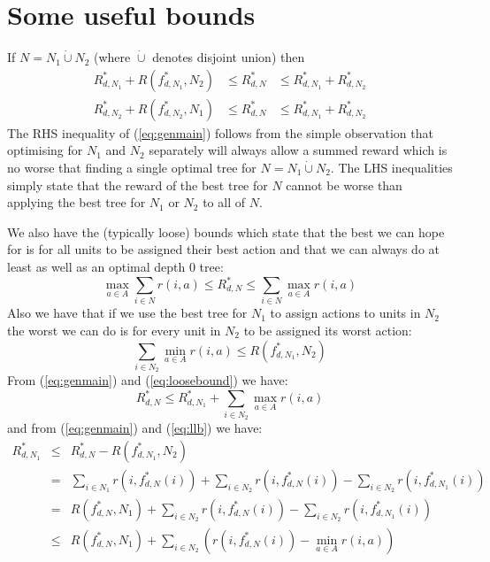 \documentclass{article}
\begin{document}
\section{Some useful bounds}
\label{sec:bounds}

If $N = N_{1} \dot\cup N_{2}$ (where $\dot\cup$ denotes disjoint
union) then
\begin{eqnarray}
  \label{eq:genmain}
 R^{*}_{d,N_{1}} + R(f^{*}_{d,N_{1}},N_{2})  & \leq R^{*}_{d,N}  & \leq  R^{*}_{d,N_{1}} + R^{*}_{d,N_{2}} \\
 R^{*}_{d,N_{2}} + R(f^{*}_{d,N_{2}},N_{1})  & \leq R^{*}_{d,N}  & \leq  R^{*}_{d,N_{1}} + R^{*}_{d,N_{2}} 
\end{eqnarray}
The RHS inequality of (\ref{eq:genmain}) follows from the simple
observation that optimising for $N_1$ and $N_2$ separately will always
allow a summed reward which is no worse that finding a single optimal
tree for $N = N_{1} \dot\cup N_{2}$. The LHS inequalities simply state
that the reward of the best tree for $N$ cannot be worse than applying
the best tree for $N_{1}$ or $N_2$ to all of $N$.

We also have the (typically loose) bounds which  state that
the best we can hope for is for all units to be assigned their best
action and that we can always do at least as well as an optimal depth 0 tree:
\begin{equation}
  \label{eq:loosebound}
\max_{a \in A} \sum_{i \in N}  r(i,a) \leq  R^{*}_{d,N} \leq \sum_{i \in N} \max_{a \in A} r(i,a) 
\end{equation}
Also we have that if we use the best tree for $N_{1}$ to assign
actions to units in $N_2$ the worst we can do is for every unit in
$N_2$ to be assigned its worst action:
\begin{equation}
  \label{eq:llb}
\sum_{i \in N_{2}} \min_{a \in A} r(i,a) \leq R(f^{*}_{d,N_{1}},N_{2})  
\end{equation}
From (\ref{eq:genmain}) and (\ref{eq:loosebound})  we have:
\begin{equation}
  \label{eq:ub}
R^{*}_{d,N}   \leq  R^{*}_{d,N_{1}} + \sum_{i \in N_{2}} \max_{a \in A} r(i,a) 
\end{equation}
and from (\ref{eq:genmain}) and (\ref{eq:llb}) we have:
\begin{eqnarray}
  \label{eq:lb}
  R^{*}_{d,N_{1}}
  & \leq
  & R^{*}_{d,N} -  R(f^{*}_{d,N_{1}},N_{2})
  \nonumber \\
  & =
  & \sum_{i\in N_{1}} r(i, f^{*}_{d,N}(i)) + \sum_{i\in N_{2}} r(i,
    f^{*}_{d,N}(i))
    - \sum_{i\in N_{2}} r(i,
    f^{*}_{d,N_{1}}(i)) \nonumber \\
  & =
  & R(f^{*}_{d,N},N_{1})
    + \sum_{i\in N_{2}} r(i,
    f^{*}_{d,N}(i))
    - \sum_{i\in N_{2}} r(i,
    f^{*}_{d,N_{1}}(i)) \nonumber \\
  & \leq
  & R(f^{*}_{d,N},N_{1}) + \sum_{i\in N_{2}} \left(
    r(i,f^{*}_{d,N}(i)) - \min_{a \in A} r(i,a) \right)
\end{eqnarray}
\end{document}
